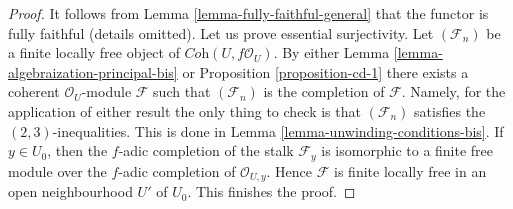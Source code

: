 \documentclass[10pt,a4paper]{amsart}
\theoremstyle{plain}
\theoremstyle{definition}
\theoremstyle{remark}
\numberwithin{equation}{subsection}
\begin{document}
\begin{proof}
It follows from Lemma \ref{lemma-fully-faithful-general}
that the functor is fully faithful (details omitted).
Let us prove essential surjectivity. Let $(\mathcal{F}_n)$ be a finite locally
free object of $\textit{Coh}(U, f\mathcal{O}_U)$. By either
Lemma \ref{lemma-algebraization-principal-bis} or
Proposition \ref{proposition-cd-1}
there exists a coherent $\mathcal{O}_U$-module $\mathcal{F}$
such that $(\mathcal{F}_n)$ is the completion of $\mathcal{F}$.
Namely, for the application of either result the only thing to
check is that $(\mathcal{F}_n)$ satisfies the $(2, 3)$-inequalities.
This is done in Lemma \ref{lemma-unwinding-conditions-bis}. If $y \in U_0$,
then the $f$-adic completion of the stalk $\mathcal{F}_y$ is isomorphic to
a finite free module over the $f$-adic completion of $\mathcal{O}_{U, y}$.
Hence $\mathcal{F}$ is finite locally free in an open neighbourhood
$U'$ of $U_0$. This finishes the proof.
\end{proof}
\end{document}
